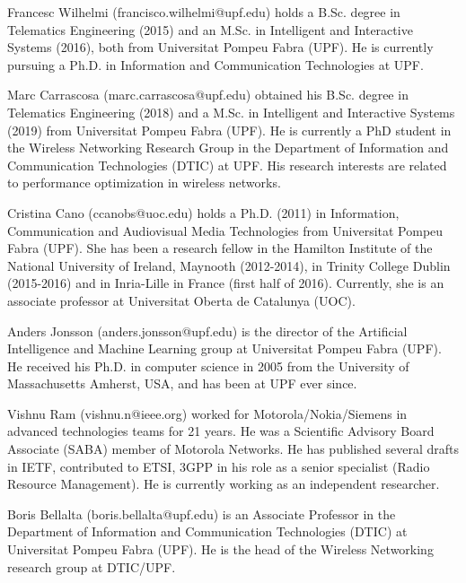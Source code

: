 \documentclass[journal]{IEEEtran}
\begin{document}
	
	
	\begin{IEEEbiographynophoto}{Francesc Wilhelmi}
		(francisco.wilhelmi@upf.edu) holds a B.Sc. degree in Telematics Engineering (2015) and an M.Sc. in Intelligent and Interactive Systems (2016), both from Universitat Pompeu Fabra (UPF). He is currently pursuing a Ph.D. in Information and Communication Technologies at UPF.
	\end{IEEEbiographynophoto}
	\begin{IEEEbiographynophoto}{Marc Carrascosa}
		(marc.carrascosa@upf.edu) obtained his B.Sc. degree in Telematics Engineering (2018) and a M.Sc. in Intelligent and Interactive Systems (2019) from Universitat Pompeu Fabra (UPF). He is currently a PhD student in the Wireless Networking Research Group in the Department of Information and Communication Technologies (DTIC) at UPF. His research interests are related to performance optimization in wireless networks.
	\end{IEEEbiographynophoto}
	\begin{IEEEbiographynophoto}{Cristina Cano}
		(ccanobs@uoc.edu) holds a Ph.D. (2011) in Information, Communication and Audiovisual Media Technologies from Universitat Pompeu Fabra (UPF). She has been a research fellow in the Hamilton Institute of the National University of Ireland, Maynooth (2012-2014), in Trinity College Dublin (2015-2016) and in Inria-Lille in France (first half of 2016). Currently, she is an associate professor at Universitat Oberta de Catalunya (UOC). 
	\end{IEEEbiographynophoto}
	\begin{IEEEbiographynophoto}{Anders Jonsson} (anders.jonsson@upf.edu) is the director of the Artificial Intelligence and Machine Learning group at Universitat Pompeu Fabra (UPF). He received his Ph.D. in computer science in 2005 from the University of Massachusetts Amherst, USA, and has been at UPF ever since.
	\end{IEEEbiographynophoto}
	\begin{IEEEbiographynophoto}{Vishnu Ram}
	(vishnu.n@ieee.org) worked for Motorola/Nokia/Siemens in advanced technologies teams for 21 years. He was a Scientific Advisory Board Associate (SABA) member of Motorola Networks. He has published several drafts in IETF, contributed to ETSI, 3GPP in his role as a senior specialist (Radio Resource Management). He is currently working as an independent researcher.	
	\end{IEEEbiographynophoto}
	\begin{IEEEbiographynophoto}{Boris Bellalta}
		(boris.bellalta@upf.edu) is an Associate Professor in the Department of Information and Communication Technologies (DTIC) at Universitat Pompeu Fabra (UPF). He is the head of the Wireless Networking research group at DTIC/UPF.
	\end{IEEEbiographynophoto}
	\vfill
	
\end{document}
